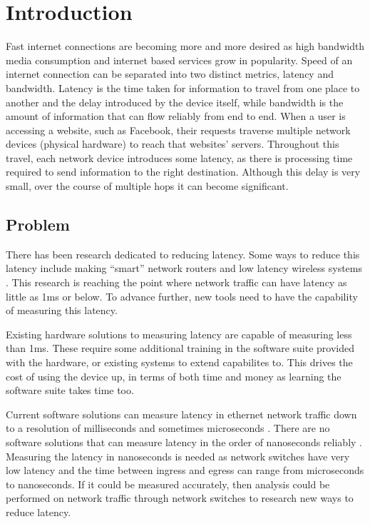 \chapter{Introduction}\label{C:intro}

\par Fast internet connections are becoming more and more desired as high bandwidth media consumption and internet based services grow in popularity. 
Speed of an internet connection can be separated into two distinct metrics, latency and bandwidth. 
Latency is the time taken for information to travel from one place to another and the delay introduced by the device itself, while bandwidth is the amount of information that can flow reliably from end to end.
When a user is accessing a website, such as Facebook, their requests traverse multiple network devices
(physical hardware) to reach that websites’ servers. Throughout this travel, each network device
introduces some latency, as there is processing time required to send information to the right
destination. Although this delay is very small, over the course of multiple hops it can become
significant.

\section{Problem}

\par There has been research dedicated to reducing latency. Some ways to reduce this latency include making “smart” network routers \cite{smartrouters} and low latency wireless systems \cite{5g}. 
This research is reaching the point where network traffic can have latency as little as 1ms \cite{lessthan1ms} or below.
To advance further, new tools need to have the capability of measuring this latency.

\par Existing hardware solutions to measuring latency are capable of measuring less than 1ms.
These require some additional training in the software suite provided with the hardware\cite{dagfeatures}, or existing systems to extend capabilites to.
This drives the cost of using the device up, in terms of both time and money as learning the software suite takes time too.

\par Current software solutions can measure latency in ethernet network traffic down to a resolution of
milliseconds and sometimes microseconds \cite{pingisbad}. There are no software solutions that can measure
latency in the order of nanoseconds reliably \cite{timeinlinux}. Measuring the latency in nanoseconds is needed as
network switches have very low latency and the time between ingress and egress can range from
microseconds to nanoseconds. If it could be measured accurately, then analysis could be performed
on network traffic through network switches to research new ways to reduce latency.

